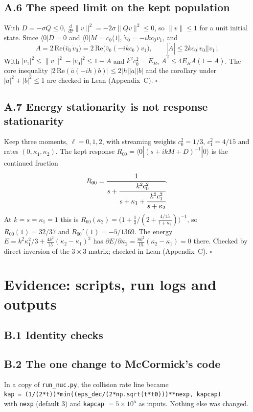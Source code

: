 \documentclass[11pt]{article}
\begin{document}
\subsection*{A.6 The speed limit on the kept population}
With $D=-\sigma Q\le0$, $\frac{d}{d\tau}\lVert v\rVert^2=-2\sigma\lVert Qv\rVert^2\le0$, so $\lVert v\rVert\le1$ for a unit initial state. Since $\langle0|D=0$ and $\langle0|M=c_0\langle1|$, $\dot v_0=-ikc_0v_1$, and
\[
\dot A=2\,\mathrm{Re}\big(\bar v_0\,\dot v_0\big)=2\,\mathrm{Re}\big(\bar v_0(-ikc_0)v_1\big),\qquad |\dot A|\le2kc_0|v_0||v_1|.
\]
With $|v_1|^2\le\lVert v\rVert^2-|v_0|^2\le1-A$ and $k^2c_0^2=E_B$, $\dot A^2\le4E_BA(1-A)$. The core inequality $|2\,\mathrm{Re}(\bar a(-ih)b)|\le2|h||a||b|$ and the corollary under $|a|^2+|b|^2\le1$ are checked in Lean (Appendix~C). $\square$
\subsection*{A.7 Energy stationarity is not response stationarity}
Keep three moments, $\ell=0,1,2$, with streaming weights $c_0^2=1/3$, $c_1^2=4/15$ and rates $(0,\kappa_1,\kappa_2)$. The kept response $R_{00}=\langle0|(s+ikM+D)^{-1}|0\rangle$ is the continued fraction
\[
R_{00}=\cfrac{1}{s+\cfrac{k^2c_0^2}{s+\kappa_1+\cfrac{k^2c_1^2}{s+\kappa_2}}} .
\]
At $k=s=\kappa_1=1$ this is $R_{00}(\kappa_2)=\big(1+\tfrac13/(2+\tfrac{4/15}{1+\kappa_2})\big)^{-1}$, so $R_{00}(1)=32/37$ and $R_{00}'(1)=-5/1369$. The energy $E=k^2\kappa_1^2/3+\tfrac{4k^2}{15}(\kappa_2-\kappa_1)^2$ has $\partial E/\partial\kappa_2=\tfrac{8k^2}{15}(\kappa_2-\kappa_1)=0$ there. Checked by direct inversion of the $3\times3$ matrix; checked in Lean (Appendix~C). $\square$

\section{Evidence: scripts, run logs and outputs}
\subsection*{B.1 Identity checks}


\subsection*{B.2 The one change to McCormick's code}
In a copy of \texttt{run\_nuc.py}, the collision rate line became\\
\texttt{kap = (1/(2*t))*min((eps\_dec/(2*np.sqrt(t*t0)))**nexp, kapcap)}\\
with \texttt{nexp} (default 3) and \texttt{kapcap} $=5\times10^5$ as inputs. Nothing else was changed.


\end{document}

